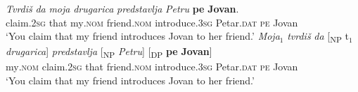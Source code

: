 \documentclass[output=paper,hidelinks,newtxmath,]{langscibook}
\begin{document}
\ea \label{15:ex28}
	\ea\label{15:ex28a}
    \gll \textit{Tvrdiš} \textit{da} \textit{moja} \textit{drugarica} \textit{predstavlja} \textit{Petru} \textbf{pe} \textbf{Jovan}.\\          
         claim\textsc{.2sg} that my\textsc{.nom} friend\textsc{.nom} introduce\textsc{.3sg} Petar\textsc{.dat} \textsc{pe} Jovan\\
         \glt `You claim that my friend introduces Jovan to her friend.'
	\ex\label{15:ex28b}
    \gll \textit{Moja}$_1$ \textit{tvrdiš} \textit{da} [\textsubscript{NP} t$_1$ \textit{drugarica}] \textit{predstavlja} [\textsubscript{NP} \textit{Petru}] [\textsubscript{DP} \textbf{pe} \textbf{Jovan}]\\
         my\textsc{.nom} claim\textsc{.2sg} that {} {} friend\textsc{.nom} introduce\textsc{.3sg} {} Petar\textsc{.dat} {} \textsc{pe} Jovan\\ 
                  \glt `You claim that my friend introduces Jovan to her friend.'
	\z
\z

\end{document}
